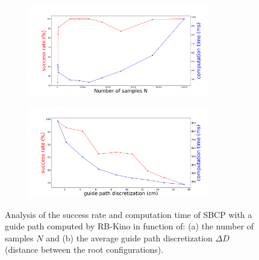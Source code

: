\begin{figure}[ht]
    \centering
    \captionsetup[subfigure]{justification=centering}
    \centering
    \begin{subfigure}[t]{.48\linewidth}
    \includegraphics[width=\textwidth, height=4cm,trim={0.5cm 0.5cm 0.5cm 0.5cm},clip]{Figures/Chapter_CPSB/success_time_samples.png}
    \caption{}
    \label{fig:cp-sb:impact_param_tuning:a}
    \end{subfigure}
    \begin{subfigure}[t]{.48\linewidth}
    \includegraphics[width=\textwidth, height=4cm,trim={0.5cm 0.5cm 0.5cm 0.5cm},clip]{Figures/Chapter_CPSB/success_time_discretization.png}
    \caption{}
    \label{fig:cp-sb:impact_param_tuning:b}
    \end{subfigure}
    \caption{Analysis of the success rate and computation time of SBCP with a guide path computed by RB-Kino in function of: (a) the number of samples $N$ and (b) the average guide path discretization $\Delta D$ (distance between the root configurations).}
    \label{fig:cp-sb:impact_param_tuning}
\end{figure}

